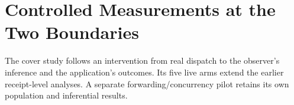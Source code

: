 \section{Controlled Measurements at the Two Boundaries}\label{sec:experiment}
The cover study follows an intervention from real dispatch to the observer's inference and the application's outcomes. Its five live arms extend the earlier receipt-level analyses. A separate forwarding/concurrency pilot retains its own population and inferential results.


